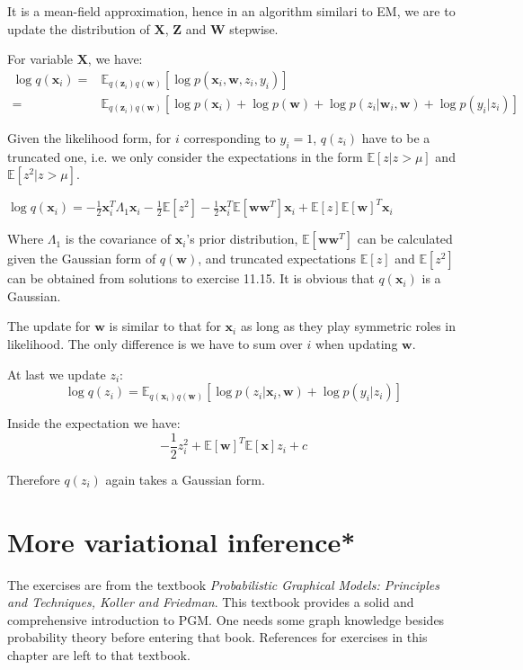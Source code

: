 \documentclass[UTF8]{ctexart}
\begin{document}
It is a mean-field approximation, hence in an algorithm similari to EM, we are to update the distribution of $\textbf{X}$, $\textbf{Z}$ and $\textbf{W}$ stepwise.

For variable $\textbf{X}$, we have:
\begin{align}
\log q(\textbf{x}_{i})=&\mathbb{E}_{q(\textbf{z}_{i})q(\textbf{w})}[\log p(\textbf{x}_{i},\textbf{w},z_{i},y_{i})] \nonumber \\
=& \mathbb{E}_{q(\textbf{z}_{i})q(\textbf{w})}[\log p(\textbf{x}_{i})+\log p(\textbf{w})+\log p(z_{i}|\textbf{w}_{i},\textbf{w})+\log p(y_{i}|z_{i})] \nonumber
\end{align}

Given the likelihood form, for $i$ corresponding to $y_{i}=1$, $q(z_{i})$ have to be a truncated one, i.e. we only consider the expectations in the form $\mathbb{E}[z|z>\mu]$ and $\mathbb{E}[z^{2}|z>\mu]$.

$\log q(\textbf{x}_{i}) = -\frac{1}{2}\textbf{x}_{i}^{T}\Lambda_{1}\textbf{x}_{i}-\frac{1}{2}\mathbb{E}[z^{2}]-\frac{1}{2}\textbf{x}^{T}_{i} \mathbb{E}[\textbf{w}\textbf{w}^{T}]\textbf{x}_{i}+\mathbb{E}[z]\mathbb{E}[\textbf{w}]^{T}\textbf{x}_{i}$

Where $\Lambda_{1}$ is the covariance of $\textbf{x}_{i}$'s prior distribution, $\mathbb{E}[\textbf{w}\textbf{w}^{T}]$ can be calculated given the Gaussian form of $q(\textbf{w})$, and truncated expectations $\mathbb{E}[z]$ and $\mathbb{E}[z^{2}]$ can be obtained from solutions to exercise 11.15. It is obvious that $q(\textbf{x}_{i})$ is a Gaussian.

The update for $\textbf{w}$ is similar to that for $\textbf{x}_{i}$ as long as they play symmetric roles in likelihood. The only difference is we have to sum over $i$ when updating $\textbf{w}$.

At last we update $z_{i}$:
$$\log q(z_{i})=\mathbb{E}_{q(\textbf{x}_{i})q(\textbf{w})}[\log p(z_{i}|\textbf{x}_{i},\textbf{w})+\log p(y_{i}|z_{i})]$$

Inside the expectation we have:
$$-\frac{1}{2}z_{i}^{2}+\mathbb{E}[\textbf{w}]^{T}\mathbb{E}[\textbf{x}]z_{i}+c$$

Therefore $q(z_{i})$ again takes a Gaussian form.

\newpage
\section{More variational inference*}
The exercises are from the textbook \emph{Probabilistic Graphical Models: Principles and Techniques, Koller and Friedman}.
This textbook provides a solid and comprehensive introduction to PGM. 
One needs some graph knowledge besides probability theory before entering that book. 
References for exercises in this chapter are left to that textbook. 
\end{document}

